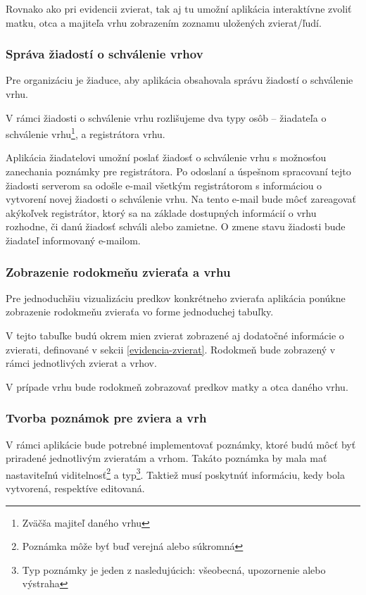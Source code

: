 Rovnako ako pri evidencii zvierat, tak aj tu umožní aplikácia interaktívne zvoliť matku, otca a majiteľa vrhu zobrazením zoznamu uložených zvierat/ľudí.

\subsubsection{Správa žiadostí o schválenie vrhov}\label{sprava-ziadosti-o-schvalenie-vrhu}
Pre organizáciu je žiaduce, aby aplikácia obsahovala správu žiadostí o schválenie vrhu.

V rámci žiadosti o schválenie vrhu rozlišujeme dva typy osôb -- žiadateľa o schválenie vrhu\footnote{Zväčša majiteľ daného vrhu}, a registrátora vrhu.

Aplikácia žiadatelovi umožní poslať žiadosť o schválenie vrhu s možnosťou zanechania poznámky pre registrátora.
Po odoslaní a úspešnom spracovaní tejto žiadosti serverom sa odošle e-mail všetkým registrátorom s informáciou o vytvorení novej žiadosti o schválenie vrhu. Na tento e-mail bude môcť zareagovať akýkoľvek registrátor, ktorý sa na základe dostupných informácií o vrhu rozhodne, či danú žiadosť schváli alebo zamietne.
O zmene stavu žiadosti bude žiadateľ informovaný e-mailom.

\subsubsection{Zobrazenie rodokmeňu zvieraťa a vrhu}\label{rodokmene}
Pre jednoduchšiu vizualizáciu predkov konkrétneho zvieraťa aplikácia ponúkne zobrazenie rodokmeňu zvieraťa vo forme jednoduchej tabuľky.

V tejto tabuľke budú okrem mien zvierat zobrazené aj dodatočné informácie o zvierati, definované v sekcii \ref{evidencia-zvierat}. Rodokmeň bude zobrazený v rámci jednotlivých zvierat a vrhov.

V prípade vrhu bude rodokmeň zobrazovať predkov matky a otca daného vrhu.

\subsubsection{Tvorba poznámok pre zviera a vrh}
V rámci aplikácie bude potrebné implementovať poznámky, ktoré budú môcť byť priradené jednotlivým zvieratám a vrhom.
Takáto poznámka by mala mať nastaviteľnú viditelnosť\footnote{Poznámka môže byť buď verejná alebo súkromná} a typ\footnote{Typ poznámky je jeden z nasledujúcich: všeobecná, upozornenie alebo výstraha}.
Taktiež musí poskytnúť informáciu, kedy bola vytvorená, respektíve editovaná.


